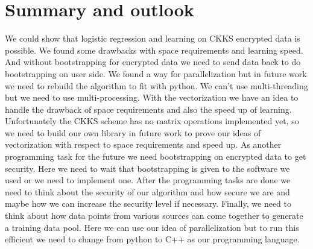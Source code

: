 \section{Summary and outlook}
\begin{text}
We could show that logistic regression and learning on CKKS encrypted data is possible. We found some drawbacks with space requirements and learning speed. And without bootstrapping for encrypted data we need to send data back to do bootstrapping on user side. \newline
We found a way for parallelization but in future work we need to rebuild the algorithm to fit with python. We can't use multi-threading but we need to use multi-processing. \newline
With the vectorization we have an idea to handle the drawback of space requirements and also the speed up of learning. Unfortunately the CKKS scheme has no matrix operations implemented yet, so we need to build our own library in future work to prove our ideas of vectorization with respect to space requirements and speed up. \newline
As another programming task for the future we need bootstrapping on encrypted data to get security. Here we need to wait that bootstrapping is given to the software we used or we need to implement one.\newline
After the programming tasks are done we need to think about the security of our algorithm and how secure we are and maybe how we can increase the security level if necessary.
Finally, we need to think about how data points from various sources can come together to generate a training data pool. Here we can use our idea of parallelization but to run this efficient we need to change from python to C++ as our programming language.
\end{text}